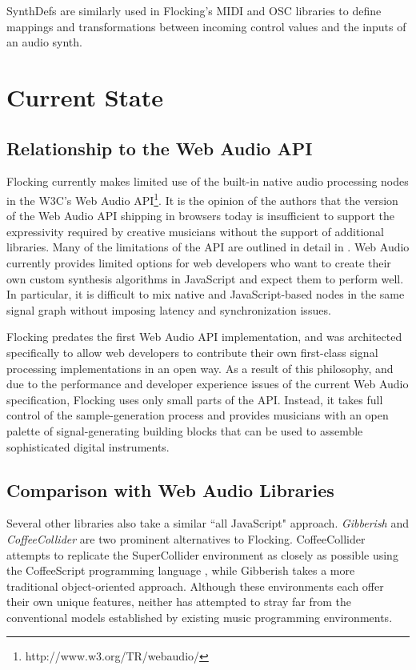 \documentclass{article}
\begin{document}
SynthDefs are similarly used in Flocking's MIDI and OSC libraries to define mappings and transformations between incoming control values and the inputs of an audio synth.

\section{Current State}

\subsection{Relationship to the Web Audio API}

Flocking currently makes limited use of the built-in native audio processing nodes in the W3C's Web Audio API\footnote{http://www.w3.org/TR/webaudio/}. It is the opinion of the authors that the version of the Web Audio API shipping in browsers today is insufficient to support the expressivity required by creative musicians without the support of additional libraries. Many of the limitations of the API are outlined in detail in \cite{DBLP:journals/comj/WyseS13}. Web Audio currently provides limited options for web developers who want to create their own custom synthesis algorithms in JavaScript and expect them to perform well. In particular, it is difficult to mix native and JavaScript-based nodes in the same signal graph without imposing latency and synchronization issues.

Flocking predates the first Web Audio API implementation, and was architected specifically to allow web developers to contribute their own first-class signal processing implementations in an open way. As a result of this philosophy, and due to the performance and developer experience issues of the current Web Audio specification, Flocking uses only small parts of the API. Instead, it takes full control of the sample-generation process and provides musicians with an open palette of signal-generating building blocks that can be used to assemble sophisticated digital instruments.

\subsection{Comparison with Web Audio Libraries}

Several other libraries also take a similar ``all JavaScript" approach. {\it Gibberish} \cite{roberts_web_2013} and {\it CoffeeCollider} \cite{Mohayonao} are two prominent alternatives to Flocking. CoffeeCollider attempts to replicate the SuperCollider environment as closely as possible using the CoffeeScript programming language \cite{Ashkenas}, while Gibberish takes a more traditional object-oriented approach. Although these environments each offer their own unique features, neither has attempted to stray far from the conventional models established by existing music programming environments.
\end{document}
